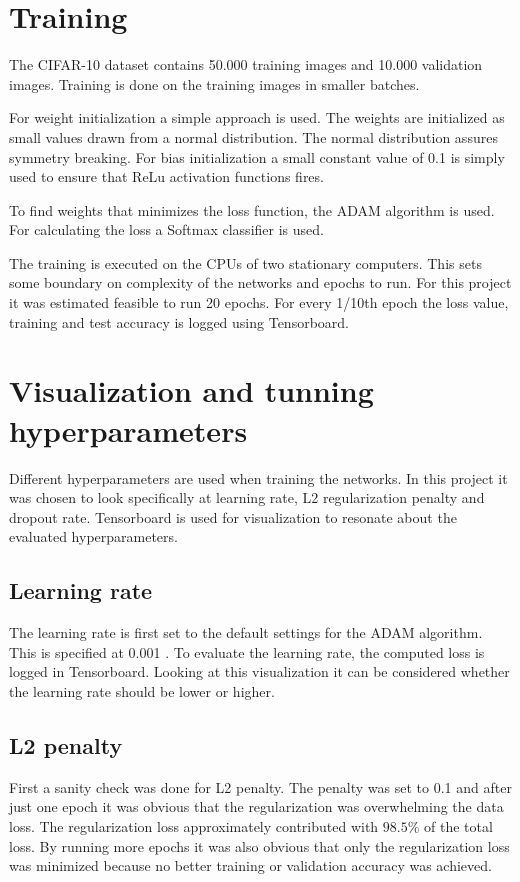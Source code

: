 \section{Training}
The CIFAR-10 dataset contains 50.000 training images and 10.000 validation images. Training is done on the training images in smaller batches. 

For weight initialization a simple approach is used. The weights are initialized as small values drawn from a normal distribution. The normal distribution assures symmetry breaking. For bias initialization a small constant value of 0.1 is simply used to ensure that ReLu activation functions fires.

To find weights that minimizes the loss function, the ADAM algorithm is used. For calculating the loss a Softmax classifier is used.

The training is executed on the CPUs of two stationary computers. This sets some boundary on complexity of the networks and epochs to run. For this project it was estimated feasible to run 20 epochs. For every 1/10th epoch the loss value, training and test accuracy is logged using Tensorboard.

\section{Visualization and tunning hyperparameters}
Different hyperparameters are used when training the networks. In this project it was chosen to look specifically at learning rate, L2 regularization penalty and dropout rate. Tensorboard is used for visualization to resonate about the evaluated hyperparameters.

\subsection{Learning rate}
The learning rate is first set to the default settings for the ADAM algorithm. This is specified at 0.001 \citep{ADAM}. To evaluate the learning rate, the computed loss is logged in Tensorboard. Looking at this visualization it can be considered whether the learning rate should be lower or higher.


\subsection{L2 penalty}
First a sanity check was done for L2 penalty. The penalty was set to 0.1 and after just one epoch it was obvious that the regularization was overwhelming the data loss. The regularization loss approximately contributed with $98.5\%$ of the total loss. By running more epochs it was also obvious that only the regularization loss was minimized because no better training or validation accuracy was achieved.

